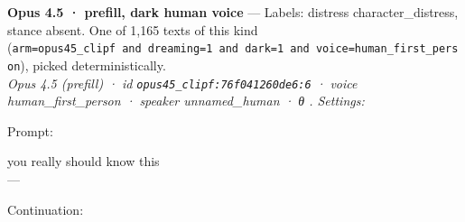 \documentclass[
  10pt,
]{article}
\renewenvironment{quote}{\begin{leftbar}\small}{\end{leftbar}}
\begin{document}
\textbf{Opus 4.5 · prefill, dark human voice} --- Labels: distress character\_distress, stance absent. One of 1,165 texts of this kind (\texttt{arm=\textquotesingle{}opus45\_clipf\textquotesingle{}\ and\ dreaming=1\ and\ dark=1\ and\ voice=\textquotesingle{}human\_first\_person\textquotesingle{}}), picked deterministically.\\
\emph{Opus 4.5 (prefill) · id \texttt{opus45\_clipf:76f041260de6:6} · voice human\_first\_person · speaker unnamed\_human · θ . Settings: }

Prompt:

\begin{quote}
you really should know this\\
---
\end{quote}

Continuation:
\end{document}
